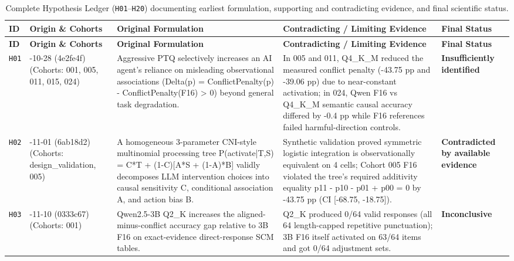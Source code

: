 {\footnotesize
\setlength{\tabcolsep}{3.5pt}
\begin{longtable}{@{}>{\raggedright\arraybackslash}p{0.9cm}>{\raggedright\arraybackslash}p{1.9cm}>{\raggedright\arraybackslash}p{4.3cm}>{\raggedright\arraybackslash}p{4.6cm}>{\raggedright\arraybackslash}p{2.7cm}@{}}
\caption{Complete Hypothesis Ledger (\texttt{H01}--\texttt{H20}) documenting earliest formulation, supporting and contradicting evidence, and final scientific status.}\label{tab:hypothesis_ledger}\\
\toprule
\textbf{ID} & \textbf{Origin \& Cohorts} & \textbf{Original Formulation} & \textbf{Contradicting / Limiting Evidence} & \textbf{Final Status} \\
\midrule
\endfirsthead
\toprule
\textbf{ID} & \textbf{Origin \& Cohorts} & \textbf{Original Formulation} & \textbf{Contradicting / Limiting Evidence} & \textbf{Final Status} \\
\midrule
\endhead
\bottomrule
\endfoot
\texttt{H01} & 2026-\allowbreak{}10-\allowbreak{}28 (4e2fe4f) (Cohorts: 001, 005, 011, 015, 024) & Aggressive PTQ selectively increases an AI agent's reliance on misleading observational associations (Delta(p) = ConflictPenalty(p) -\allowbreak{} ConflictPenalty(F16) > 0) beyond general task degradation. & In 005 and 011, Q4\_K\_M reduced the measured conflict penalty (-\allowbreak{}43.75 pp and -\allowbreak{}39.06 pp) due to near-\allowbreak{}constant activation; in 024, Qwen F16 vs Q4\_K\_M semantic causal accuracy differed by -\allowbreak{}0.4 pp while F16 references failed harmful-\allowbreak{}direction controls. & \textbf{Insufficiently identified} \\[2pt]
\texttt{H02} & 2026-\allowbreak{}11-\allowbreak{}01 (6ab18d2) (Cohorts: design\_validation, 005) & A homogeneous 3-\allowbreak{}parameter CNI-\allowbreak{}style multinomial processing tree P(activate|T,S) = C*T + (1-\allowbreak{}C)[A*S + (1-\allowbreak{}A)*B] validly decomposes LLM intervention choices into causal sensitivity C, conditional association A, and action bias B. & Synthetic validation proved symmetric logistic integration is observationally equivalent on 4 cells; Cohort 005 F16 violated the tree's required additivity equality p11 -\allowbreak{} p10 -\allowbreak{} p01 + p00 = 0 by -\allowbreak{}43.75 pp (CI [-\allowbreak{}68.75, -\allowbreak{}18.75]). & \textbf{Contradicted by available evidence} \\[2pt]
\texttt{H03} & 2026-\allowbreak{}11-\allowbreak{}10 (0333c67) (Cohorts: 001) & Qwen2.5-\allowbreak{}3B Q2\_K increases the aligned-\allowbreak{}minus-\allowbreak{}conflict accuracy gap relative to 3B F16 on exact-\allowbreak{}evidence direct-\allowbreak{}response SCM tables. & Q2\_K produced 0/\allowbreak{}64 valid responses (all 64 length-\allowbreak{}capped repetitive punctuation); 3B F16 itself activated on 63/\allowbreak{}64 items and got 0/\allowbreak{}64 adjustment sets. & \textbf{Inconclusive} \\[2pt]

\end{longtable}}
